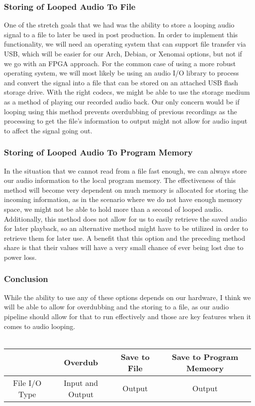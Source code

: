 \documentclass[onecolumn, draftclsnofoot,10pt, compsoc]{IEEEtran}
\begin{document}
        \subsubsection{Storing of Looped Audio To File}
        One of the stretch goals that we had was the ability to store a looping audio signal to a file to later be used in post production. In order to implement this functionality, we will need an operating system that can support file transfer via USB, which will be easier for our Arch, Debian, or Xenomai options, but not if we go with an FPGA approach. For the common case of using a more robust operating system, we will most likely be using an audio I/O library to process and convert the signal into a file that can be stored on an attached USB flash storage drive. With the right codecs, we might be able to use the storage medium as a method of playing our recorded audio back. Our only concern would be if looping using this method prevents overdubbing of previous recordings as the processing to get the file's information to output might not allow for audio input to affect the signal going out.
        
        \subsubsection{Storing of Looped Audio To Program Memory}
        In the situation that we cannot read from a file fast enough, we can always store our audio information to the local program memory. The effectiveness of this method will become very dependent on much memory is allocated for storing the incoming information, as in the scenario where we do not have enough memory space, we might not be able to hold more than a second of looped audio. Additionally, this method does not allow for us to easily retrieve the saved audio for later playback, so an alternative method might have to be utilized in order to retrieve them for later use. A benefit that this option and the preceding method share is that their values will have a very small chance of ever being lost due to power loss.
        
        \subsubsection{Conclusion}
        While the ability to use any of these options depends on our hardware, I think we will be able to allow for overdubbing and the storing to a file, as our audio pipeline should allow for that to run effectively and those are key features when it comes to audio looping.\\
        \\
        \begin{tabular}{c|c|c|c}
             & Overdub & Save to File & Save to Program Memeory \\
            \hline
            File I/O Type & Input and Output & Output & Output \\
        \end{tabular}



\end{document}
